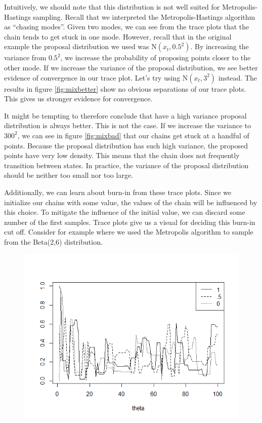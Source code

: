 \documentclass[11pt]{amsart}
\theoremstyle{theorem} %
\theoremstyle{definition}                  %
\theoremstyle{example}                       %
\theoremstyle{remark}                       %
\numberwithin{equation}{section}
\begin{document}
Intuitively, we should note that this distribution is not well suited for Metropolis-Hastings sampling. Recall that we interpreted the Metropolis-Hastings algorithm as ``chasing modes''. Given two modes, we can see from the trace plots that the chain tends to get stuck in one mode. However, recall that in the original example the proposal distribution we used was N$(x_t,0.5^2)$. By increasing the variance from $0.5^2$, we increase the probability of proposing points closer to the other mode. If we increase the variance of the proposal distribution, we see better evidence of convergence in our trace plot. Let's try using N$(x_t,3^2)$ instead. The results in figure \ref{fig:mixbetter} show no obvious separations of our trace plots. This gives us stronger evidence for convergence.

It might be tempting to therefore conclude that have a high variance proposal distribution is always better. This is not the case. If we increase the variance to $300^2$, we can see in figure \ref{fig:mixbad} that our chains get stuck at a handful of points. Because the proposal distribution has such high variance, the proposed points have very low density. This means that the chain does not frequently transition between states. In practice, the variance of the proposal distribution should be neither too small nor too large.

Additionally, we can learn about burn-in from these trace plots. Since we initialize our chains with some value, the values of the chain will be influenced by this choice. To mitigate the influence of the initial value, we can discard some number of the first samples. Trace plots give us a visual for deciding this burn-in cut off. Consider for example where we used the Metropolis algorithm to sample from the Beta(2,6) distribution.

\begin{figure}[h]
    \centering
    \includegraphics[width= .75\textwidth]{betamixturestarts.png}
    \label{fig:betamixstarts}
\end{figure}
\end{document}
